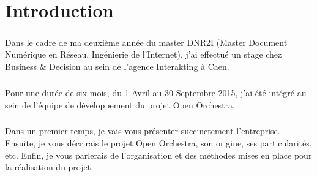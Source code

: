 \chapter*{Introduction}
        \paragraph{}
         Dans le cadre de ma deuxième année du master DNR2I (Master Document Numérique en Réseau, Ingénierie de l'Internet), j'ai effectué un stage chez Business \& Decision au sein de l'agence Interakting à Caen.
         \paragraph{}
          Pour une durée de six mois, du 1 Avril au 30 Septembre 2015, j'ai été intégré au sein de l'équipe de développement du projet Open Orchestra.
         \paragraph{}
         Dans un premier temps, je vais vous présenter succinctement l'entreprise. Ensuite, je vous décrirais le projet Open Orchestra, son origine, ses particularités, etc. Enfin, je vous parlerais de l'organisation et des méthodes mises en place pour la réalisation du projet.
